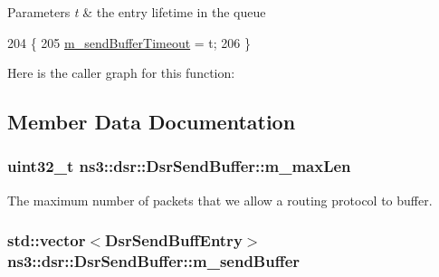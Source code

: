 \begin{DoxyParams}{Parameters}
{\em t} & the entry lifetime in the queue \\
\hline
\end{DoxyParams}

\begin{DoxyCode}
204   \{
205     \hyperlink{classns3_1_1dsr_1_1DsrSendBuffer_a69009e6cefeda83be7eada52fdc8680e}{m\_sendBufferTimeout} = t;
206   \}
\end{DoxyCode}


Here is the caller graph for this function\+:




\subsection{Member Data Documentation}
\subsubsection[{\texorpdfstring{m\+\_\+max\+Len}{m_maxLen}}]{\setlength{\rightskip}{0pt plus 5cm}uint32\+\_\+t ns3\+::dsr\+::\+Dsr\+Send\+Buffer\+::m\+\_\+max\+Len\hspace{0.3cm}{\ttfamily [private]}}\hypertarget{classns3_1_1dsr_1_1DsrSendBuffer_ad42bfd04653608404029c7a2554fd963}{}\label{classns3_1_1dsr_1_1DsrSendBuffer_ad42bfd04653608404029c7a2554fd963}


The maximum number of packets that we allow a routing protocol to buffer. 

\subsubsection[{\texorpdfstring{m\+\_\+send\+Buffer}{m_sendBuffer}}]{\setlength{\rightskip}{0pt plus 5cm}std\+::vector$<${\bf Dsr\+Send\+Buff\+Entry}$>$ ns3\+::dsr\+::\+Dsr\+Send\+Buffer\+::m\+\_\+send\+Buffer\hspace{0.3cm}{\ttfamily [private]}}\hypertarget{classns3_1_1dsr_1_1DsrSendBuffer_a7ce6425b23f8949a515f5624031e5fd7}{}\label{classns3_1_1dsr_1_1DsrSendBuffer_a7ce6425b23f8949a515f5624031e5fd7}


